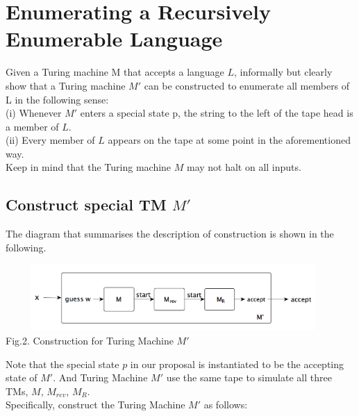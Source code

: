 \documentclass[11pt,a4paper]{article}
\newcommand{\htab}{\hspace*{0.63cm}}
\begin{document}
\section{Enumerating a Recursively Enumerable Language}
Given a Turing machine M that accepts a language $L$, informally but clearly show that a Turing machine $M′$
can be constructed to enumerate all members of L in the following sense: \\
    \htab (i) Whenever $M'$ enters a special state p, the string to the left of the tape head is a member of $L$. \\
    \htab (ii) Every member of $L$ appears on the tape at some point in the aforementioned way.  \\
Keep in mind that the Turing machine $M$ may not halt on all inputs.
\subsection{Construct special TM $M'$}
\htab The diagram that summarises the description of construction is shown in the following.
\begin{center}
\includegraphics[width=5in,height=1in]{./TM2.png} \\
\footnotesize Fig.2. Construction for Turing Machine $M'$
\end{center}
\htab Note that the special state $p$ in our proposal is instantiated to be the accepting state of $M'$. 
And Turing Machine $M'$ use the same tape to simulate all three TMs, $M$, $M_{rev}$, $M_{R}$.\\
\htab Specifically, construct the Turing Machine $M'$ as follows: 
\end{document}
